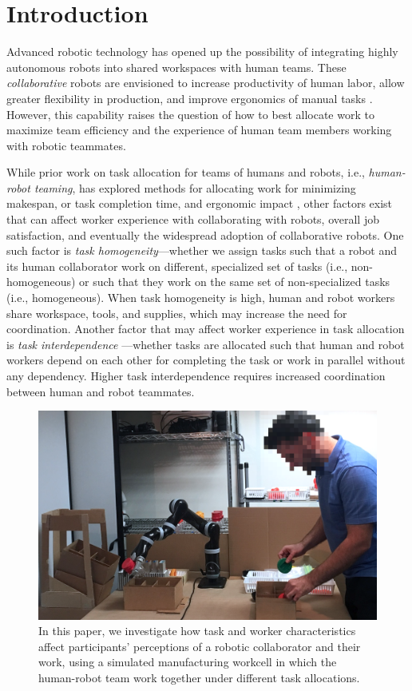 \section{Introduction}
Advanced robotic technology has opened up the possibility of integrating highly autonomous robots into shared workspaces with human teams. These \textit{collaborative} robots are envisioned to increase productivity of human labor, allow greater flexibility in production, and improve ergonomics of manual tasks \cite{peshkin1999cobots, tan2009human}. However, this capability raises the question of how to best allocate work to maximize team efficiency and the experience of human team members working with robotic teammates.
       
While prior work on task allocation for teams of humans and robots, i.e., \textit{human-robot teaming}, has explored methods for allocating work for minimizing makespan, or task completion time, and ergonomic impact \cite{shah2011improved, gombolay2014decision, tsarouchi2017ijcim}, other factors exist that can affect worker experience with collaborating with robots, overall job satisfaction, and eventually the widespread adoption of collaborative robots. One such factor is \textit{task homogeneity}---whether we assign tasks such that a robot and its human collaborator work on different, specialized set of tasks (i.e., non-homogeneous) or such that they work on the same set of non-specialized tasks (i.e., homogeneous). When task homogeneity is high, human and robot workers share workspace, tools, and supplies, which may increase the need for coordination. Another factor that may affect worker experience in task allocation is \textit{task interdependence} \cite{kiggundu1983task}---whether tasks are allocated such that human and robot workers depend on each other for completing the task or work in parallel without any dependency. Higher task interdependence requires increased coordination between human and robot teammates. 

\begin{figure}[t!]
	\caption{In this paper, we investigate how task and worker characteristics affect participants' perceptions of a robotic collaborator and their work, using a simulated manufacturing workcell in which the human-robot team work together under different task allocations.}\vspace{4pt}
	\label{fig:teaser}
	\includegraphics[width=\columnwidth]{figures/teaser.png}
\end{figure} 

